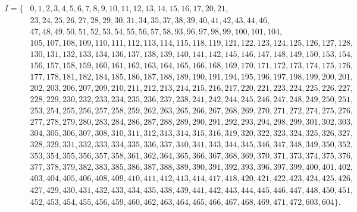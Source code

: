 \begin{align*}
I=\{&0, 1, 2, 3, 4, 5, 6, 7, 8, 9, 10, 11, 12, 13, 14, 15, 16, 17, 20, 21,\\
&23, 24, 25, 26, 27, 28, 29, 30, 31, 34, 35, 37, 38, 39, 40, 41, 42, 43, 44, 46,\\
&47, 48, 49, 50, 51, 52, 53, 54, 55, 56, 57, 58, 93, 96, 97, 98, 99, 100, 101, 104,\\
&105, 107, 108, 109, 110, 111, 112, 113, 114, 115, 118, 119, 121, 122, 123, 124, 125, 126, 127, 128,\\
&130, 131, 132, 133, 134, 136, 137, 138, 139, 140, 141, 142, 145, 146, 147, 148, 149, 150, 153, 154,\\
&156, 157, 158, 159, 160, 161, 162, 163, 164, 165, 166, 168, 169, 170, 171, 172, 173, 174, 175, 176,\\
&177, 178, 181, 182, 184, 185, 186, 187, 188, 189, 190, 191, 194, 195, 196, 197, 198, 199, 200, 201,\\
&202, 203, 206, 207, 209, 210, 211, 212, 213, 214, 215, 216, 217, 220, 221, 223, 224, 225, 226, 227,\\
&228, 229, 230, 232, 233, 234, 235, 236, 237, 238, 241, 242, 244, 245, 246, 247, 248, 249, 250, 251,\\
&253, 254, 255, 256, 257, 258, 259, 262, 263, 265, 266, 267, 268, 269, 270, 271, 272, 274, 275, 276,\\
&277, 278, 279, 280, 283, 284, 286, 287, 288, 289, 290, 291, 292, 293, 294, 298, 299, 301, 302, 303,\\
&304, 305, 306, 307, 308, 310, 311, 312, 313, 314, 315, 316, 319, 320, 322, 323, 324, 325, 326, 327,\\
&328, 329, 331, 332, 333, 334, 335, 336, 337, 340, 341, 343, 344, 345, 346, 347, 348, 349, 350, 352,\\
&353, 354, 355, 356, 357, 358, 361, 362, 364, 365, 366, 367, 368, 369, 370, 371, 373, 374, 375, 376,\\
&377, 378, 379, 382, 383, 385, 386, 387, 388, 389, 390, 391, 392, 393, 396, 397, 399, 400, 401, 402,\\
&403, 404, 405, 406, 408, 409, 410, 411, 412, 413, 414, 417, 418, 420, 421, 422, 423, 424, 425, 426,\\
&427, 429, 430, 431, 432, 433, 434, 435, 438, 439, 441, 442, 443, 444, 445, 446, 447, 448, 450, 451,\\
&452, 453, 454, 455, 456, 459, 460, 462, 463, 464, 465, 466, 467, 468, 469, 471, 472, 603, 604\}.
\end{align*}
